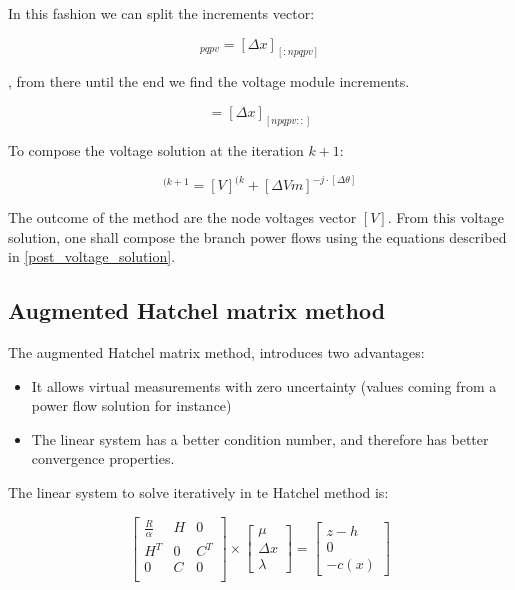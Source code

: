 \documentclass[nols,a4paper,twoside,symmetric,notoc,fleqn]{tufte-book}
\begin{document}
In this fashion we can split the increments vector:

\begin{equation}
[\Delta \theta] _{pqpv} = [\Delta x]_{[:npqpv]}
\end{equation}

, from there until the end we find the voltage module increments.

\begin{equation}
 [\Delta Vm] = [\Delta x]_{[npqpv::]}
\end{equation}

To compose the voltage solution at the iteration $k+1$:

\begin{equation}
[V]^{(k+1} =  [V]^{(k} + [\Delta Vm] ^{-j \cdot [\Delta \theta]}
\end{equation}

The outcome of the method are the node voltages vector $[V]$. From this voltage solution, one shall compose the branch power flows using the equations described in \ref{post_voltage_solution}.

\subsection{Augmented Hatchel matrix method}

The augmented Hatchel matrix method, introduces two advantages: 
\begin{itemize}
	\item It allows virtual measurements with zero uncertainty (values coming from a power flow solution for instance)
	\item The linear system has a better condition number, and therefore has better convergence properties.
\end{itemize}

The linear system to solve iteratively in te Hatchel method is:

\begin{equation}
\begin{bmatrix}
\frac{R}{\alpha} & H & 0 \\
H^T & 0 & C^T \\
0 & C & 0 \\
\end{bmatrix}
\times
\begin{bmatrix}
\mu\\
\Delta x\\
\lambda
\end{bmatrix}
=
\begin{bmatrix}
z-h\\
0\\
-c(x)
\end{bmatrix}
\end{equation}
\end{document}
